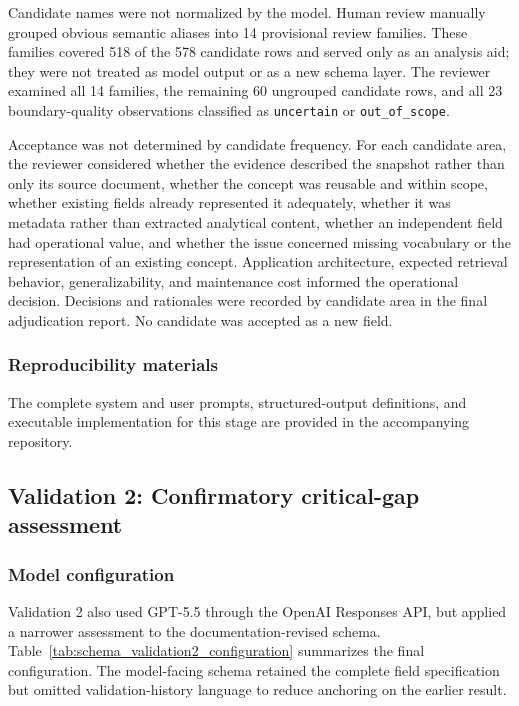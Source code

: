 \documentclass{article}
\begin{document}
Candidate names were not normalized by the model. Human review manually grouped obvious semantic aliases into 14 provisional review families. These families covered 518 of the 578 candidate rows and served only as an analysis aid; they were not treated as model output or as a new schema layer. The reviewer examined all 14 families, the remaining 60 ungrouped candidate rows, and all 23 boundary-quality observations classified as \texttt{uncertain} or \texttt{out\_of\_scope}.

Acceptance was not determined by candidate frequency. For each candidate area, the reviewer considered whether the evidence described the snapshot rather than only its source document, whether the concept was reusable and within scope, whether existing fields already represented it adequately, whether it was metadata rather than extracted analytical content, whether an independent field had operational value, and whether the issue concerned missing vocabulary or the representation of an existing concept. Application architecture, expected retrieval behavior, generalizability, and maintenance cost informed the operational decision. Decisions and rationales were recorded by candidate area in the final adjudication report. No candidate was accepted as a new field.

\subsubsection{Reproducibility materials}

The complete system and user prompts, structured-output definitions, and executable implementation for this stage are provided in the accompanying repository.

\subsection{Validation 2: Confirmatory critical-gap assessment}

\subsubsection{Model configuration}

Validation 2 also used GPT-5.5 through the OpenAI Responses API, but applied a narrower assessment to the documentation-revised schema. Table~\ref{tab:schema_validation2_configuration} summarizes the final configuration. The model-facing schema retained the complete field specification but omitted validation-history language to reduce anchoring on the earlier result.
\end{document}
